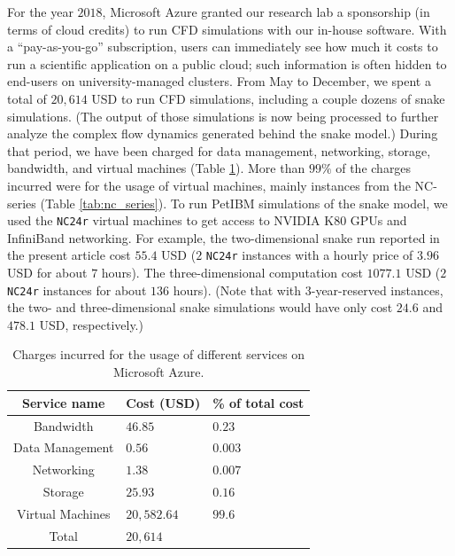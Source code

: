 \documentclass[10pt,journal,compsoc]{IEEEtran}
\begin{document}
For the year $2018$, Microsoft Azure granted our research lab a sponsorship (in terms of cloud credits) to run CFD simulations with our in-house software.
With a ``pay-as-you-go'' subscription, users can immediately see how much it costs to run a scientific application on a public cloud; such information is often hidden to end-users on university-managed clusters.
From May to December, we spent a total of $20,614$ USD to run CFD simulations, including a couple dozens of snake simulations.
(The output of those simulations is now being processed to further analyze the complex flow dynamics generated behind the snake model.)
During that period, we have been charged for data management, networking, storage, bandwidth, and virtual machines (Table \ref{tab:azure_charges}).
More than $99\%$ of the charges incurred were for the usage of virtual machines, mainly instances from the NC-series (Table \ref{tab:nc_series}).
To run PetIBM simulations of the snake model, we used the \texttt{NC24r} virtual machines to get access to NVIDIA K80 GPUs and InfiniBand networking.
For example, the two-dimensional snake run reported in the present article cost $55.4$ USD ($2$ \texttt{NC24r} instances with a hourly price of $3.96$ USD for about $7$ hours).
The three-dimensional computation cost $1077.1$ USD ($2$ \texttt{NC24r} instances for about $136$ hours).
(Note that with 3-year-reserved instances, the two- and three-dimensional snake simulations would have only cost $24.6$ and $478.1$ USD, respectively.)

\begin{table}
    \renewcommand{\arraystretch}{1.5}
    \caption{Charges incurred for the usage of different services on Microsoft Azure.}
    \label{tab:azure_charges}
    \centering
    \begin{tabular}{cll}
        Service name & Cost (USD) & \% of total cost \\
        \hline
        Bandwidth & $46.85$ & $0.23$ \\
        Data Management & $0.56$ & $0.003$ \\
        Networking & $1.38$ & $0.007$ \\
        Storage & $25.93$ & $0.16$ \\
        Virtual Machines & $20,582.64$& $99.6$ \\
        \hline
        Total & $20,614$ & \\
        \hline
    \end{tabular}
\end{table}
\end{document}
